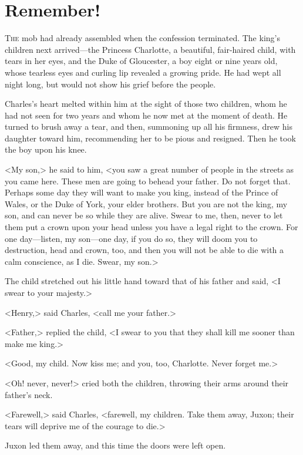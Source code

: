 \chapter{Remember!}
	
\lettrine{T}{he} mob had already assembled when the confession terminated. The king's children next arrived—the Princess Charlotte, a beautiful, fair-haired child, with tears in her eyes, and the Duke of Gloucester, a boy eight or nine years old, whose tearless eyes and curling lip revealed a growing pride. He had wept all night long, but would not show his grief before the people.

Charles's heart melted within him at the sight of those two children, whom he had not seen for two years and whom he now met at the moment of death. He turned to brush away a tear, and then, summoning up all his firmness, drew his daughter toward him, recommending her to be pious and resigned. Then he took the boy upon his knee.

<My son,> he said to him, <you saw a great number of people in the streets as you came here. These men are going to behead your father. Do not forget that. Perhaps some day they will want to make you king, instead of the Prince of Wales, or the Duke of York, your elder brothers. But you are not the king, my son, and can never be so while they are alive. Swear to me, then, never to let them put a crown upon your head unless you have a legal right to the crown. For one day—listen, my son—one day, if you do so, they will doom you to destruction, head and crown, too, and then you will not be able to die with a calm conscience, as I die. Swear, my son.>

The child stretched out his little hand toward that of his father and said, <I swear to your majesty.>

<Henry,> said Charles, <call me your father.>

<Father,> replied the child, <I swear to you that they shall kill me sooner than make me king.>

<Good, my child. Now kiss me; and you, too, Charlotte. Never forget me.>

<Oh! never, never!> cried both the children, throwing their arms around their father's neck.

<Farewell,> said Charles, <farewell, my children. Take them away, Juxon; their tears will deprive me of the courage to die.>

Juxon led them away, and this time the doors were left open.


